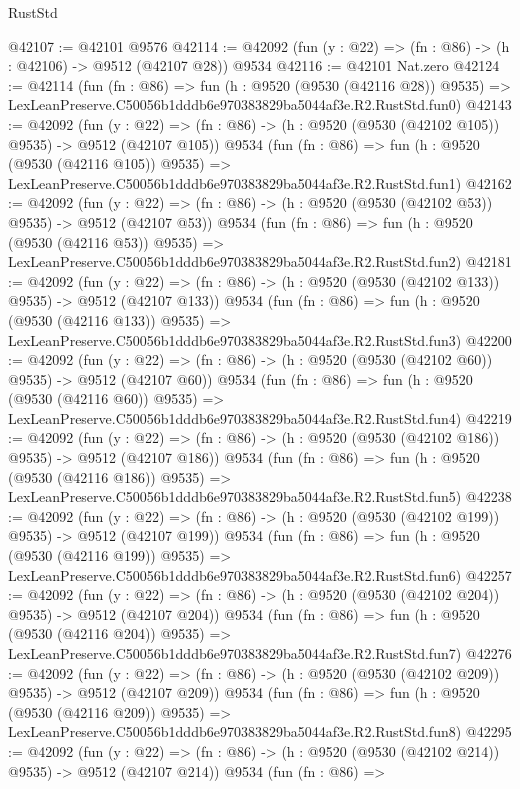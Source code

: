 \begin{lexlean}{RustStd}
\begin{coremodule}
@42107 := @42101 @9576
@42114 := @42092 (fun (y : @22) => (fn : @86) -> (h : @42106) -> @9512 (@42107 @28)) @9534
@42116 := @42101 Nat.zero
@42124 := @42114
    (fun (fn : @86) =>
    fun (h : @9520 (@9530 (@42116 @28)) @9535) =>
    LexLeanPreserve.C50056b1dddb6e970383829ba5044af3e.R2.RustStd.fun0)
@42143 := @42092
    (fun (y : @22) => (fn : @86) -> (h : @9520 (@9530 (@42102 @105)) @9535) -> @9512 (@42107 @105))
    @9534
    (fun (fn : @86) =>
    fun (h : @9520 (@9530 (@42116 @105)) @9535) =>
    LexLeanPreserve.C50056b1dddb6e970383829ba5044af3e.R2.RustStd.fun1)
@42162 := @42092
    (fun (y : @22) => (fn : @86) -> (h : @9520 (@9530 (@42102 @53)) @9535) -> @9512 (@42107 @53))
    @9534
    (fun (fn : @86) =>
    fun (h : @9520 (@9530 (@42116 @53)) @9535) =>
    LexLeanPreserve.C50056b1dddb6e970383829ba5044af3e.R2.RustStd.fun2)
@42181 := @42092
    (fun (y : @22) => (fn : @86) -> (h : @9520 (@9530 (@42102 @133)) @9535) -> @9512 (@42107 @133))
    @9534
    (fun (fn : @86) =>
    fun (h : @9520 (@9530 (@42116 @133)) @9535) =>
    LexLeanPreserve.C50056b1dddb6e970383829ba5044af3e.R2.RustStd.fun3)
@42200 := @42092
    (fun (y : @22) => (fn : @86) -> (h : @9520 (@9530 (@42102 @60)) @9535) -> @9512 (@42107 @60))
    @9534
    (fun (fn : @86) =>
    fun (h : @9520 (@9530 (@42116 @60)) @9535) =>
    LexLeanPreserve.C50056b1dddb6e970383829ba5044af3e.R2.RustStd.fun4)
@42219 := @42092
    (fun (y : @22) => (fn : @86) -> (h : @9520 (@9530 (@42102 @186)) @9535) -> @9512 (@42107 @186))
    @9534
    (fun (fn : @86) =>
    fun (h : @9520 (@9530 (@42116 @186)) @9535) =>
    LexLeanPreserve.C50056b1dddb6e970383829ba5044af3e.R2.RustStd.fun5)
@42238 := @42092
    (fun (y : @22) => (fn : @86) -> (h : @9520 (@9530 (@42102 @199)) @9535) -> @9512 (@42107 @199))
    @9534
    (fun (fn : @86) =>
    fun (h : @9520 (@9530 (@42116 @199)) @9535) =>
    LexLeanPreserve.C50056b1dddb6e970383829ba5044af3e.R2.RustStd.fun6)
@42257 := @42092
    (fun (y : @22) => (fn : @86) -> (h : @9520 (@9530 (@42102 @204)) @9535) -> @9512 (@42107 @204))
    @9534
    (fun (fn : @86) =>
    fun (h : @9520 (@9530 (@42116 @204)) @9535) =>
    LexLeanPreserve.C50056b1dddb6e970383829ba5044af3e.R2.RustStd.fun7)
@42276 := @42092
    (fun (y : @22) => (fn : @86) -> (h : @9520 (@9530 (@42102 @209)) @9535) -> @9512 (@42107 @209))
    @9534
    (fun (fn : @86) =>
    fun (h : @9520 (@9530 (@42116 @209)) @9535) =>
    LexLeanPreserve.C50056b1dddb6e970383829ba5044af3e.R2.RustStd.fun8)
@42295 := @42092
    (fun (y : @22) => (fn : @86) -> (h : @9520 (@9530 (@42102 @214)) @9535) -> @9512 (@42107 @214))
    @9534
    (fun (fn : @86) =>

\end{coremodule}
\end{lexlean}

